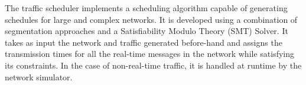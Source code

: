 \documentclass[conference]{IEEEtran}
\begin{document}

The traffic scheduler implements a scheduling algorithm capable of generating schedules for large and complex networks. It is developed using a combination of segmentation approaches and a Satisfiability Modulo Theory (SMT) Solver. It takes as input the network and traffic generated before-hand and assigns the transmission times for all the real-time messages in the network while satisfying its constraints. In the case of non-real-time traffic, it is handled at runtime by the network simulator.
\end{document}
